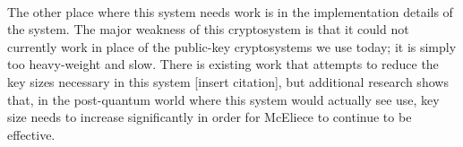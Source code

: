 \documentclass{article}
\theoremstyle{definition}
\begin{document}
	\paragraph{} The other place where this system needs work is in the implementation details of the system.  The major weakness of this cryptosystem is that it could not currently work in place of the public-key cryptosystems we use today; it is simply too heavy-weight and slow.  There is existing work that attempts to reduce the key sizes necessary in this system [insert citation], but additional research shows that, in the post-quantum world where this system would actually see use, key size needs to increase significantly in order for McEliece to continue to be effective.
\end{document}
